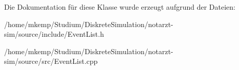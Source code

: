 Die Dokumentation für diese Klasse wurde erzeugt aufgrund der Dateien\+:\begin{DoxyCompactItemize}
\item 
/home/mkemp/\+Studium/\+Diskrete\+Simulation/notarzt-\/sim/source/include/Event\+List.\+h\item 
/home/mkemp/\+Studium/\+Diskrete\+Simulation/notarzt-\/sim/source/src/Event\+List.\+cpp\end{DoxyCompactItemize}
